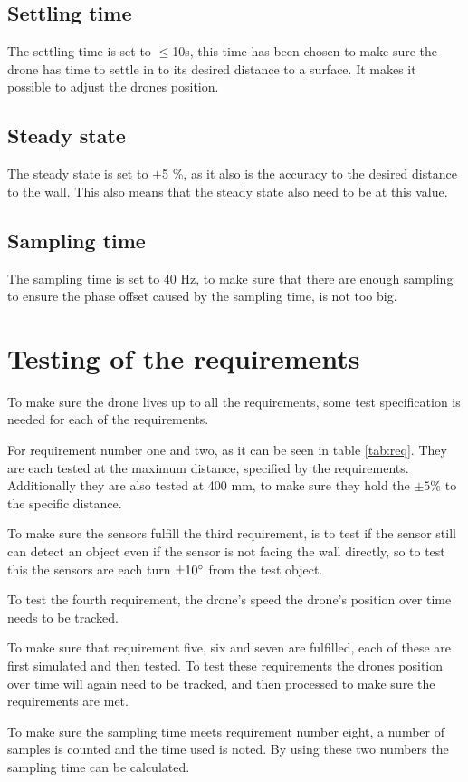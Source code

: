 \subsection*{Settling time}
The settling time is set to $\leq$10s, this time has been chosen to make sure the drone has time to settle in to its desired distance to a surface. It makes it possible to adjust the drones position. 
\subsection*{Steady state}
The steady state is set to  $\pm$5 \%, as it also is the accuracy to the desired distance to the wall. This also means that the steady state also need to be at this value. 

\subsection*{Sampling time}
The sampling time is set to 40 Hz, to make sure that there are enough sampling to ensure the phase offset caused by the sampling time, is not too big.

\section{Testing of the requirements}\label{s:test_requirements}
To make sure the drone lives up to all the requirements, some test specification is needed for each of the requirements.


For requirement number one and two, as it can be seen in table \ref{tab:req}. They are each tested at the maximum distance, specified by the requirements. Additionally they are also tested at 400 mm, to make sure they hold the $\pm5 \%$ to the specific distance. 


To make sure the sensors fulfill the third requirement, is to test if the sensor still can detect an object even if the sensor is not facing the wall directly, so to test this the sensors are each turn $\pm10\degree$ from the test object.


To test the fourth requirement, the drone's speed the drone's position over time needs to be tracked.


To make sure that requirement five, six and seven are fulfilled, each of these are first simulated and then tested. To test these requirements the drones position over time will again need to be tracked, and then processed to make sure the requirements are met. 


To make sure the sampling time meets requirement number eight, a number of samples is counted and the time used is noted. By using 
these two numbers the sampling time can be calculated. 

